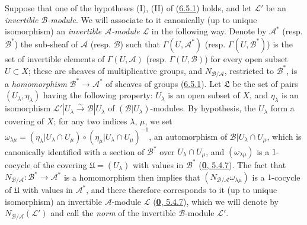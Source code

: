 \begin{env}[6.5.2]
\label{II.6.5.2}
Suppose that one of the hypotheses (I), (II) of
(\hyperref[II.6.5.1]{6.5.1}) holds, and let $\mathcal{L}'$ be an
\emph{invertible $\mathcal{B}$-module}. We will associate to it canonically
(up to unique isomorphism) an \emph{invertible $\mathcal{A}$-module}
$\mathcal{L}$ in the following way. Denote by $\mathcal{A}^*$ (resp.
$\mathcal{B}^*$) the sub-sheaf of $\mathcal{A}$ (resp. $\mathcal{B}$) such
that $\Gamma(U,\mathcal{A}^*)$ (resp. $\Gamma(U,\mathcal{B}^*)$) is the set
of
invertible elements of $\Gamma(U,\mathcal{A})$ (resp.
$\Gamma(U,\mathcal{B})$) for every open subset $U\subset X$; these are
sheaves of multiplicative groups, and $N_{\mathcal{B}/\mathcal{A}}$,
restricted to $\mathcal{B}^*$, is a \emph{homomorphism}
$\mathcal{B}^*\to\mathcal{A}^*$ of sheaves of groups
(\hyperref[II.6.5.1]{6.5.1}). Let $\mathfrak{L}$ be the set of pairs
$(U_\lambda,\eta_\lambda)$ having the following property: $U_\lambda$ is an
open subset of $X$, and $\eta_\lambda$ is an isomorphism
$\mathcal{L}'|U_\lambda\xrightarrow{\sim}\mathcal{B}|U_\lambda$ of
$(\mathcal{B}|U_\lambda)$-modules. By hypothesis, the $U_\lambda$ form a
covering of $X$; for any two indices $\lambda$, $\mu$, we set
$\omega_{\lambda\mu}=(\eta_\lambda|U_\lambda\cap U_\mu)
\circ(\eta_\mu|U_\lambda\cap U_\mu)^{-1}$, an automorphism of
$\mathcal{B}|U_\lambda\cap U_\mu$, which is canonically identified with a
section of $\mathcal{B}^*$ over $U_\lambda\cap U_\mu$, and
$(\omega_{\lambda\mu})$ is a $1$-cocycle of the covering
$\mathfrak{U}=(U_\lambda)$ with values in $\mathcal{B}^*$
(\hyperref[0.5.4.7]{\textbf{0}, 5.4.7}). The fact that
$N_{\mathcal{B}/\mathcal{A}}:\mathcal{B}^*\to\mathcal{A}^*$ is a
homomorphism then implies that
$(N_{\mathcal{B}/\mathcal{A}}\omega_{\lambda\mu})$ is a $1$-cocycle of
$\mathfrak{U}$ with values in $\mathcal{A}^*$, and there therefore
corresponds to it (up to unique isomorphism) an invertible
$\mathcal{A}$-module $\mathcal{L}$ (\hyperref[0.5.4.7]{\textbf{0}, 5.4.7}), which
we will denote by $N_{\mathcal{B}/\mathcal{A}}(\mathcal{L}')$ and call
the \emph{norm} of the invertible $\mathcal{B}$-module $\mathcal{L}'$.


\end{env}
